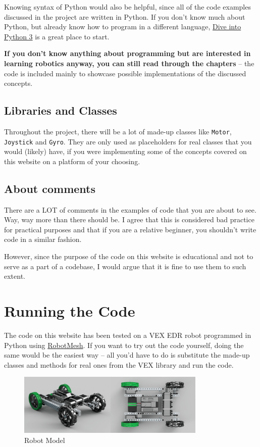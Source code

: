 \documentclass[12pt,twoside]{article}
\begin{document}
Knowing syntax of Python would also be helpful, since all of the code examples discussed in the project are written in Python. If you don't know much about Python, but already know how to program in a different language, \href{http://histo.ucsf.edu/BMS270/diveintopython3-r802.pdf}{Dive into Python 3} is a great place to start.

\textbf{If you don't know anything about programming but are interested in learning robotics anyway, you can still read through the chapters} -- the code is included mainly to showcase possible implementations of the discussed concepts.


\subsection{Libraries and Classes}
Throughout the project, there will be a lot of made-up classes like \texttt{Motor}, \texttt{Joystick} and \texttt{Gyro}. They are only used as placeholders for real classes that you would (likely) have, if you were implementing some of the concepts covered on this website on a platform of your choosing.


\subsection{About comments}
There are a LOT of comments in the examples of code that you are about to see. Way, way more than there should be. I agree that this is considered bad practice for practical purposes and that if you are a relative beginner, you shouldn't write code in a similar fashion.

However, since the purpose of the code on this website is educational and not to serve as a part of a codebase, I would argue that it is fine to use them to such extent.





\section{Running the Code}


The code on this website has been tested on a VEX EDR robot programmed in Python using \href{https://www.robotmesh.com/}{RobotMesh}. If you want to try out the code yourself, doing the same would be the easiest way -- all you'd have to do is substitute the made-up classes and methods for real ones from the VEX library and run the code.

\begin{figure}[H]
\centering
\includegraphics[width=0.8\textwidth]{../assets/images/robot.png}
\caption{Robot Model}
\end{figure}
\end{document}
